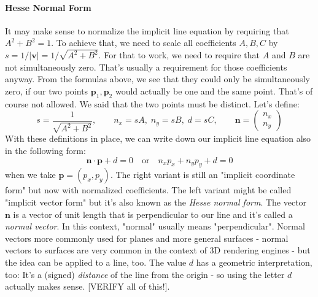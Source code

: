 \paragraph{Hesse Normal Form}
It may make sense to normalize the implicit line equation by requiring that $A^2 + B^2 = 1$. To achieve that, we need to scale all coefficients $A,B,C$ by $s = 1 / |\mathbf{v}| = 1 / \sqrt{A^2 + B^2}$. For that to work, we need to require that $A$ and $B$ are not simultaneously zero. That's usually a requirement for those coefficients anyway. From the formulas above, we see that they could only be simultaneously zero, if our two points $\mathbf{p}_1, \mathbf{p}_2$ would actually be one and the same point. That's of course not allowed. We said that the two points must be distinct. Let's define:
\begin{equation}
 s = \frac{1}{\sqrt{A^2 + B^2}}, \qquad
 n_x = s A, \;
 n_y = s B, \;
 d   = s C, \qquad
 \mathbf{n} = \begin{pmatrix} n_x \\ n_y \end{pmatrix}
\end{equation}
With these definitions in place, we can write down our implicit line equation also in the following form:
\begin{equation}
 \mathbf{n} \cdot \mathbf{p} + d = 0 \quad \text{or} \quad
 n_x p_x + n_y p_y + d = 0
\end{equation}
when we take $\mathbf{p} = (p_x, p_y)$. The right variant is still an "implicit coordinate form" but now with normalized coefficients. The left variant might be called "implicit vector form" but it's also known as the \emph{Hesse normal form}. The vector $\mathbf{n}$ is a vector of unit length that is perpendicular to our line and it's called a \emph{normal vector}. In this context, "normal" usually means "perpendicular". Normal vectors more commonly used for planes and more general surfaces - normal vectors to surfaces are very common in the context of 3D rendering engines - but the idea can be applied to a line, too. The value $d$ has a geometric interpretation, too: It's a (signed) \emph{distance} of the line from the origin - so using the letter $d$ actually makes sense.  [VERIFY all of this!].


